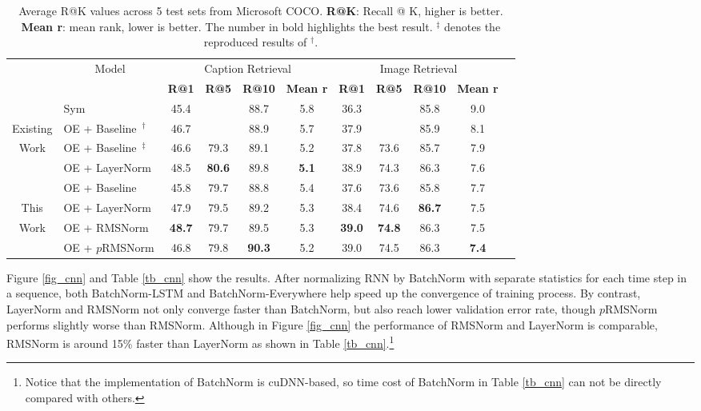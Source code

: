 \documentclass{article}
\begin{document}
\begin{table}[t]
\scriptsize
\centering
\begin{tabular}{c|l|cccc|ccccc}
& \multicolumn{1}{c|}{\multirow{2}{*}{Model}} & \multicolumn{4}{|c|}{Caption Retrieval} & \multicolumn{4}{|c}{Image Retrieval} \\
\cline{3-10}
& & \textbf{R@1} & \textbf{R@5} & \textbf{R@10} & \textbf{Mean r} & \textbf{R@1} & \textbf{R@5} & \textbf{R@10} & \textbf{Mean r} \\
\hline
\hline
    & Sym~\cite{vendrov2015order} & 45.4 & & 88.7 & 5.8 & 36.3 & & 85.8 & 9.0 \\
Existing
    & OE + Baseline~\cite{vendrov2015order}$^{\dagger}$ & 46.7 & & 88.9 & 5.7 & 37.9 & & 85.9 & 8.1 \\
Work
    & OE + Baseline~\cite{ba2016layer}$^{\ddagger}$ & 46.6 & 79.3 & 89.1 & 5.2 & 37.8 & 73.6 & 85.7 & 7.9 \\
    & OE + LayerNorm~\cite{ba2016layer} & 48.5 & \textbf{80.6} & {89.8} & \textbf{5.1} & 38.9 & 74.3 & 86.3 & 7.6 \\
\hline
\hline

    & OE + Baseline & 45.8 & 79.7 & 88.8 & 5.4 & 37.6 & 73.6 & 85.8 & 7.7 \\
{This}
    & OE + LayerNorm & 47.9 & 79.5 & 89.2 & 5.3 & 38.4 & 74.6 & \textbf{86.7} & 7.5 \\
Work
    & OE + RMSNorm & \textbf{48.7} & 79.7 & 89.5 & 5.3 & \textbf{39.0} & \textbf{74.8} & 86.3 & {7.5} \\
    & OE + $p$RMSNorm & 46.8 & 79.8 & \textbf{90.3} & 5.2 & 39.0 & 74.5 & 86.3 & \textbf{7.4} \\
\end{tabular}
\caption{\label{tb_oe} Average R@K values across 5 test sets from Microsoft COCO. \textbf{R@K}: Recall @ K, higher is better. \textbf{Mean r}: mean rank, lower is better. The number in bold highlights the best result. $^{\ddagger}$ denotes the reproduced results of $^{\dagger}$.} 
\vspace{-0.30in}
\end{table}


Figure \ref{fig_cnn} and Table \ref{tb_cnn} show the results. After normalizing RNN by BatchNorm with separate statistics for each time step in a sequence, both BatchNorm-LSTM and BatchNorm-Everywhere help speed up the convergence of training process. By contrast, LayerNorm and RMSNorm not only converge faster than BatchNorm, but also reach lower validation error rate, though $p$RMSNorm performs slightly worse than RMSNorm. Although in Figure \ref{fig_cnn} the performance of RMSNorm and LayerNorm is comparable, RMSNorm is around 15\% faster than LayerNorm as shown in Table \ref{tb_cnn}.\footnote{Notice that the implementation of BatchNorm is cuDNN-based, so time cost of BatchNorm in Table \ref{tb_cnn} can not be directly compared with others.} 
\end{document}
